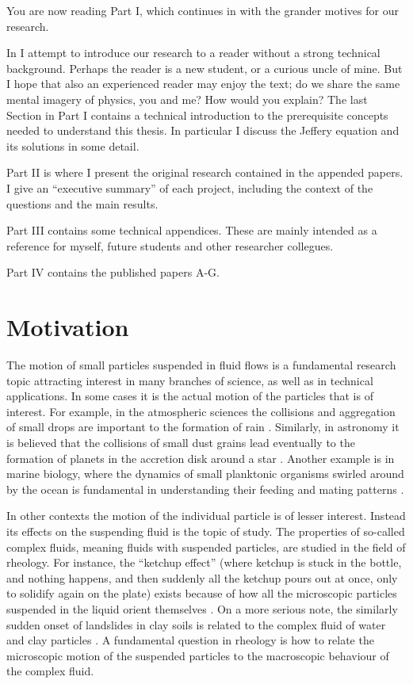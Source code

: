 \documentclass[thesis.tex]{subfiles}
\begin{document}
You are now reading Part I, which continues in  with the grander motives for our research.

In  I attempt to introduce our research to a reader without a strong technical background. Perhaps the reader is a new student, or a curious uncle of mine. But I hope that also an experienced reader may enjoy the text; do we share the same mental imagery of physics, you and me? How would you explain?
The last Section in Part I contains a technical introduction to the prerequisite concepts needed to understand this thesis. In particular I discuss the Jeffery equation and its solutions in some detail. 

Part II is where I present the original research contained in the appended papers. I give an ``executive summary'' of each project, including the context of the questions and the main results.

Part III contains some technical appendices. These are mainly intended as a reference for myself, future students and other researcher collegues.

Part IV contains the published papers A-G.


\chapter{Motivation}\label{sec:motivation}

The motion of small particles suspended in fluid flows is a fundamental research topic attracting interest in many branches of science, as well as in technical applications. In some cases it is the actual motion of the particles that is of interest. For example, in the atmospheric sciences the collisions and aggregation of small drops are important to the formation of rain \cite{devenish2012}. Similarly, in astronomy it is believed that the collisions of small dust grains lead eventually to the formation of planets in the accretion disk around a star \cite{wilkinson2008}. Another example is in marine biology, where the dynamics of small planktonic organisms swirled around by the ocean is fundamental in understanding their feeding and mating patterns \cite{guasto2012}. 

In other contexts the motion of the individual particle is of lesser interest. Instead its effects on the suspending fluid is the topic of study. The properties of so-called complex fluids, meaning fluids with suspended particles, are studied in the field of rheology. For instance, the ``ketchup effect'' (where ketchup is stuck in the bottle, and nothing happens, and then suddenly all the ketchup pours out at once, only to solidify again on the plate) exists because of how all the microscopic particles suspended in the liquid orient themselves \cite{bayod2008}. On a more serious note, the similarly sudden onset of landslides in clay soils is related to the complex fluid of water and clay particles \cite{coussot2002}. A fundamental question in rheology is how to relate the microscopic motion of the suspended particles to the macroscopic behaviour of the complex fluid.
\end{document}
